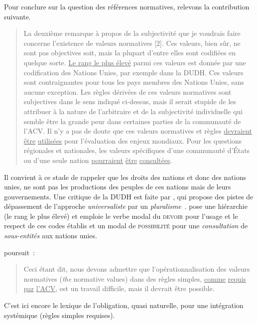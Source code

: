 

Pour conclure sur la question des références normatives, relevons la contribution suivante.
\blockcquote[traduction, termes personnellement soulignés]{klopffer_subjective_1998}{
La deuxième remarque à propos de la subjectivité que je voudrais faire concerne l'existence de valeurs normatives [2].
Ces valeurs, bien sûr, ne sont pas objectives soit, mais la plupart d'entre elles sont codifiées en quelque sorte.
\underline{Le rang le plus élevé} parmi ces valeurs est donnée par une codification des Nations Unies, par exemple dans la \gls{DUDH}.
Ces valeurs sont contraignantes pour tous les pays membres des Nations Unies, sans aucune exception.
Les règles dérivées de ces valeurs normatives sont subjectives dans le sens indiqué ci-dessus, mais il serait stupide de les attribuer à la nature de l'arbitraire et de la subjectivité individuelle qui semble être la grande peur dans certaines parties de la communauté de l'\gls{ACV}.
Il n'y a pas de doute que ces valeurs normatives et règles \underline{devraient} \underline{être} \underline{utilisées} pour l'évaluation des enjeux mondiaux.
Pour les questions régionales et nationales, les valeurs spécifiques d'une communauté d'États ou d'une seule nation \underline{pourraient} \underline{être} \underline{consultées}.
}
Il convient à ce stade de rappeler que les droits des nations et donc des nations unies, ne sont pas les productions des peuples de ces nations mais de leurs gouvernements.
Une critique de la \gls{DUDH} est faite par \citeauthor{eberhard_au-a_2009}, qui propose des pistes de dépassement de l’approche \emph{universaliste} par un \emph{pluralisme}~\cite{eberhard_au-a_2009}.
\citeauthor{klopffer_subjective_1998} pose une hiérarchie (le rang le plus élevé) et emploie le verbe modal du \textsc{devoir} pour l'usage et le respect de ces codes établis et un modal de \textsc{possibilité} pour une \emph{consultation} de \textit{sous-entités} aux nations unies.

\citeauthor{klopffer_subjective_1998} poursuit~:
\blockcquote[traduction, termes personnellement soulignés]{klopffer_subjective_1998}{
Ceci étant dit, nous devons admettre que l'opérationnalisation des valeurs normatives (\textit{the} normative values) dans des règles simples, \underline{comme} \underline{requis} \underline{par} \underline{l'\gls{ACV}}, est un travail difficile, mais il devrait être possible.
}
C'est ici encore le lexique de l'obligation, quasi naturelle, pour une intégration systémique (règles simples requises).


